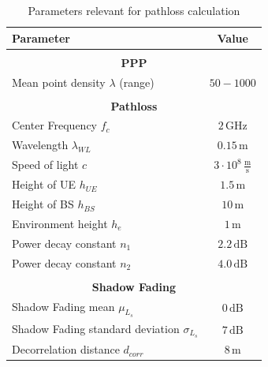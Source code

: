 \begin{table}
\begin{center}
 \begin{tabular}{||p{10.5cm}|p{2.5cm}||} 
 \hline
 \textbf{Parameter} & \multicolumn{1}{|c||}{\textbf{Value}}\\
 \hline
 \multicolumn{2}{c}{} \\[-0.7em]
 \hline
 \multicolumn{2}{||c||}{\textbf{PPP}} \\
 \hline
 Mean point density $\lambda$ (range) & \multicolumn{1}{|c||}{$50 - 1000$} \\ 
 \hline
 \multicolumn{2}{c}{} \\[-0.7em]
 \hline
 \multicolumn{2}{||c||}{\textbf{Pathloss}} \\
 \hline
 Center Frequency $f_c$& \multicolumn{1}{|c||}{$2\,\text{GHz}$} \\
 \hline
 Wavelength $\lambda_{WL}$ & \multicolumn{1}{|c||}{$0.15\,\text{m}$}\\
 \hline
 Speed of light $c$ & \multicolumn{1}{|c||}{$3 \cdot 10^8\,\frac{\text{m}}{\text{s}}$}\\
 \hline
 Height of UE $h_{UE}$ & \multicolumn{1}{|c||}{$1.5\,\text{m}$} \\
 \hline
 Height of BS $h_{BS}$ & \multicolumn{1}{|c||}{$10\,\text{m}$} \\
 \hline
 Environment height $h_e$ & \multicolumn{1}{|c||}{$1\,\text{m}$} \\
 \hline
 Power decay constant $n_1$ & \multicolumn{1}{|c||}{$2.2\,\text{dB}$}\\
 \hline
 Power decay constant $n_2$ & \multicolumn{1}{|c||}{$4.0\,\text{dB}$}\\
 \hline
 \multicolumn{2}{c}{} \\[-0.7em]
 \hline
 \multicolumn{2}{||c||}{\textbf{Shadow Fading}} \\
 \hline
 Shadow Fading mean $\mu_{L_s}$ &\multicolumn{1}{|c||}{$0\,\text{dB}$} \\
 \hline
 Shadow Fading standard deviation $\sigma_{L_s}$ & \multicolumn{1}{|c||}{$7\,\text{dB}$}\\
 \hline
 Decorrelation distance $d_{corr}$ &\multicolumn{1}{|c||}{$8\,\text{m}$}\\
 \hline
\end{tabular}
\end{center}
\caption{Parameters relevant for pathloss calculation}
\label{tbl:PL}
\end{table}

